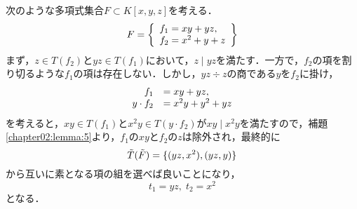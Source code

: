 \begin{example}
	次のような多項式集合$F\subset K[x, y, z]$を考える．
	\begin{equation}
		F = 
		\left\{
		\begin{array}{l}
			f_1 = xy + yz, \\
			f_2 = x^2 + y + z \notag
		\end{array}
		\right\}
	\end{equation}
	まず，$z \in T(f_2)$と$yz \in T(f_1)$において，$z \mid yz$を満たす．一方で，$f_2$の項を割り切るような$f_1$の項は存在しない．しかし，$yz \div z$の商である$y$を$f_2$に掛け，
	\begin{equation}
		\begin{array}{rl}
			f_1 &= xy + yz, \\
			y\cdot f_2 &= x^2y + y^2 + yz \notag
		\end{array}
	\end{equation}
	を考えると，$xy \in T(f_1)$と$x^2y \in T(y \cdot f_2)$が$xy \mid x^2y$を満たすので，補題\ref{chapter02:lemma:5}より，$f_1$の$xy$と$f_2$の$z$は除外され，最終的に
	\begin{equation}
		\tilde{T}(\tilde{F}) = \{ (yz, x^2), (yz, y) \} \notag
	\end{equation}
	から互いに素となる項の組を選べば良いことになり，
	$$t_1 = yz, \; t_2 = x^2$$
	となる．
\end{example}



















